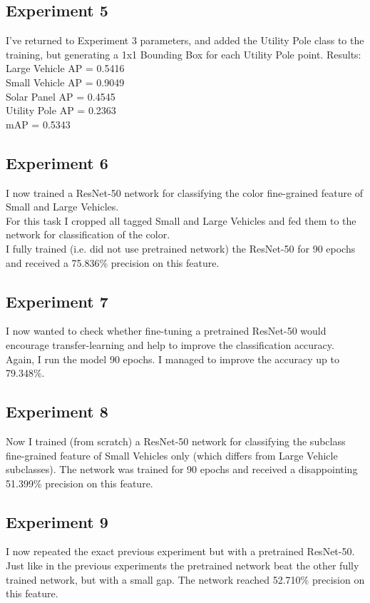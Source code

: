 \documentclass[]{article}
\begin{document}
\subsection{Experiment 5}
I've returned to Experiment 3 parameters, and added the Utility Pole class to the training, but generating a 1x1 Bounding Box for each Utility Pole point.
Results:\\
Large Vehicle AP = 0.5416\\
Small Vehicle AP = 0.9049\\
Solar Panel AP = 0.4545\\
Utility Pole AP = 0.2363\\
mAP = 0.5343

\subsection{Experiment 6}
I now trained a ResNet-50 network for classifying the color fine-grained feature of Small and Large Vehicles.\\
For this task I cropped all tagged Small and Large Vehicles and fed them to the network for classification of the color.\\
I fully trained (i.e. did not use pretrained network) the ResNet-50 for 90 epochs and received a 75.836\% precision on this feature.

\subsection{Experiment 7}
I now wanted to check whether fine-tuning a pretrained ResNet-50 would encourage transfer-learning and help to improve the classification accuracy.
Again, I run the model 90 epochs.
I managed to improve the accuracy up to 79.348\%.

\subsection{Experiment 8}
Now I trained (from scratch) a ResNet-50 network for classifying the subclass fine-grained feature of Small Vehicles only (which differs from Large Vehicle subclasses).
The network was trained for 90 epochs and received a disappointing 51.399\% precision on this feature.

\subsection{Experiment 9}
I now repeated the exact previous experiment but with a pretrained ResNet-50.\\
Just like in the previous experiments the pretrained network beat the other fully trained network, but with a small gap. The network reached 52.710\% precision on this feature.
\end{document}
